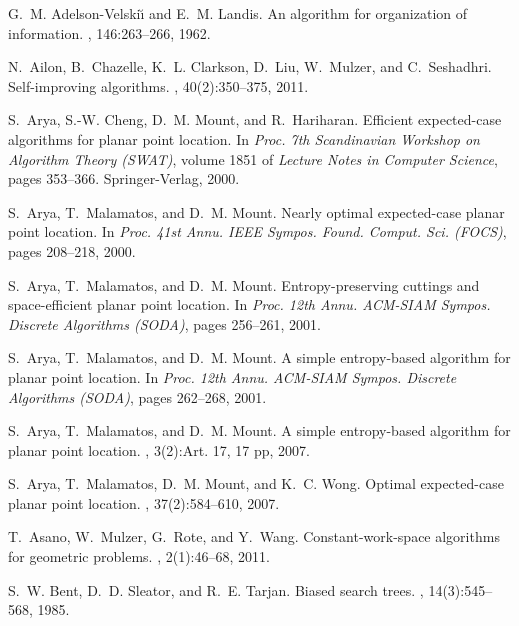 \documentclass[11pt]{article}
\begin{document}
\newcommand{\SortNoop}[1]{}\def\cprime{}
\begin{thebibliography}{10}

G.~M. Adel{\cprime}son-Vel{\cprime}ski{\u\i} and E.~M. Landis.
\newblock An algorithm for organization of information.
, 146:263--266, 1962.

N.~Ailon, B.~Chazelle, K.~L. Clarkson, D.~Liu, W.~Mulzer, and C.~Seshadhri.
\newblock Self-improving algorithms.
, 40(2):350--375, 2011.

S.~Arya, S.-W. Cheng, D.~M. Mount, and R.~Hariharan.
\newblock Efficient expected-case algorithms for planar point location.
\newblock In {\em Proc. 7th Scandinavian Workshop on Algorithm Theory (SWAT)},
  volume 1851 of {\em Lecture Notes in Computer Science}, pages 353--366.
  Springer-Verlag, 2000.

S.~Arya, T.~Malamatos, and D.~M. Mount.
\newblock Nearly optimal expected-case planar point location.
\newblock In {\em Proc. 41st Annu. IEEE Sympos. Found. Comput. Sci. (FOCS)},
  pages 208--218, 2000.

S.~Arya, T.~Malamatos, and D.~M. Mount.
\newblock Entropy-preserving cuttings and space-efficient planar point
  location.
\newblock In {\em Proc. 12th Annu. ACM-SIAM Sympos. Discrete Algorithms
  (SODA)}, pages 256--261, 2001.

S.~Arya, T.~Malamatos, and D.~M. Mount.
\newblock A simple entropy-based algorithm for planar point location.
\newblock In {\em Proc. 12th Annu. ACM-SIAM Sympos. Discrete Algorithms
  (SODA)}, pages 262--268, 2001.

S.~Arya, T.~Malamatos, and D.~M. Mount.
\newblock A simple entropy-based algorithm for planar point location.
, 3(2):Art. 17, 17 pp, 2007.

S.~Arya, T.~Malamatos, D.~M. Mount, and K.~C. Wong.
\newblock Optimal expected-case planar point location.
, 37(2):584--610, 2007.

T.~Asano, W.~Mulzer, G.~Rote, and Y.~Wang.
\newblock Constant-work-space algorithms for geometric problems.
, 2(1):46--68, 2011.

S.~W. Bent, D.~D. Sleator, and R.~E. Tarjan.
\newblock Biased search trees.
, 14(3):545--568, 1985.


\end{thebibliography}
\end{document}
